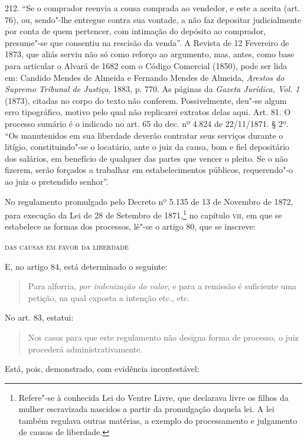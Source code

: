 {  212. ``Se o comprador reenvia a cousa comprada ao vendedor, e este a
  aceita (art. 76), ou, sendo"-lhe entregue contra sua vontade, a não faz
  depositar judicialmente por conta de quem pertencer, com intimação do
  depósito ao comprador, presume"-se que consentiu na rescisão da venda''.
  A Revista de 12 Fevereiro de 1873, que aliás serviu não só como
  reforço ao argumento, mas, antes, como base para articular o
  Alvará de 1682 com o Código Comercial (1850), pode ser lida em: 
 Candido Mendes de Almeida e Fernando Mendes de Almeida,
 \emph{Arestos do Supremo Tribunal de Justiça}, 1883, p. 770. As páginas da
  \emph{Gazeta Jurídica, Vol. 1} (1873), citadas no corpo do texto não
  conferem. Possivelmente, deu"-se algum erro tipográfico, motivo pelo
  qual não replicarei extratos delas aqui. Art. 81. O processo sumário é
  o indicado no art. 65 do dec. nº 4.824 de 22/11/1871. § 2º. ``Os
  manutenidos em sua liberdade deverão contratar seus serviços durante o
  litígio, constituindo"-se o locatário, ante o juiz da causa, bom e fiel
  depositário dos salários, em benefício de qualquer das partes que
  vencer o pleito. Se o não fizerem, serão forçados a trabalhar em
  estabelecimentos públicos, requerendo"-o ao juiz o pretendido senhor''.}

No regulamento promulgado pelo Decreto nº 5.135 de 13 de Novembro de
1872, para execução da Lei de 28 de Setembro de 1871,\footnote{
  Refere"-se à conhecida Lei do Ventre Livre, que declarava livre os
  filhos da mulher escravizada nascidos a partir da promulgação daquela
  lei. A lei também regulava outras matérias, a exemplo do processamento
  e julgamento de causas de liberdade.} no capítulo \textsc{vii}, em que se
estabelece as formas dos processos, lê"-se o artigo 80, que se inscreve:

\textsc{das causas em favor da liberdade}

E, no artigo 84, está determinado o seguinte:

\begin{quote}
Para alforria, \emph{por indenização do valor}, e para a remissão é
suficiente uma petição, na qual exposta a intenção etc., etc.
\end{quote}

No art. 83, estatui:

\begin{quote}
Nos casos para que este regulamento não designa forma de processo, o
juiz procederá administrativamente.
\end{quote}

Está, pois, demonstrado, com evidência incontestável:

